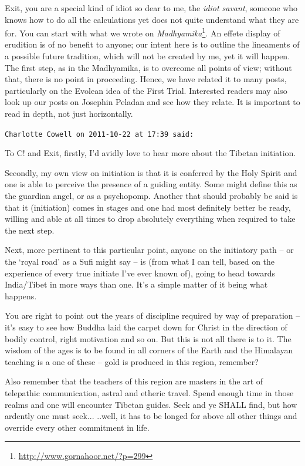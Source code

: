 \begin{footnotesize}
\begin{sffamily}
Exit, you are a special kind of idiot so dear to me, the \emph{idiot savant}, someone who knows how to do all the calculations yet does not quite understand what they are for. You can start with what we wrote on \textit{Madhyamika}\footnote{\url{http://www.gornahoor.net/?p=299}}. An effete display of erudition is of no benefit to anyone; our intent here is to outline the lineaments of a possible future tradition, which will not be created by me, yet it will happen. The first step, as in the Madhyamika, is to overcome all points of view; without that, there is no point in proceeding. Hence, we have related it to many posts, particularly on the Evolean idea of the First Trial. Interested readers may also look up our posts on Josephin Peladan and see how they relate. It is important to read in depth, not just horizontally.

\hfill

\texttt{Charlotte Cowell on 2011-10-22 at 17:39 said:}

To C! and Exit, firstly, I'd avidly love to hear more about the Tibetan initiation.

Secondly, my own view on initiation is that it is conferred by the Holy Spirit and one is able to perceive the presence of a guiding entity. Some might define this as the guardian angel, or as a psychopomp. Another that should probably be said is that it (initiation) comes in stages and one had most definitely better be ready, willing and able at all times to drop absolutely everything when required to take the next step.

Next, more pertinent to this particular point, anyone on the initiatory path -- or the `royal road' as a Sufi might say -- is (from what I can tell, based on the experience of every true initiate I've ever known of), going to head towards India/Tibet in more ways than one. It's a simple matter of it being what happens.

You are right to point out the years of discipline required by way of preparation -- it's easy to see how Buddha laid the carpet down for Christ in the direction of bodily control, right motivation and so on. But this is not all there is to it. The wisdom of the ages is to be found in all corners of the Earth and the Himalayan teaching is a one of these -- gold is produced in this region, remember?

Also remember that the teachers of this region are masters in the art of telepathic communication, astral and etheric travel. Spend enough time in those realms and one will encounter Tibetan guides. Seek and ye SHALL find, but how ardently one must seek... ..well, it has to be longed for above all other things and override every other commitment in life.


\end{sffamily}
\end{footnotesize}
